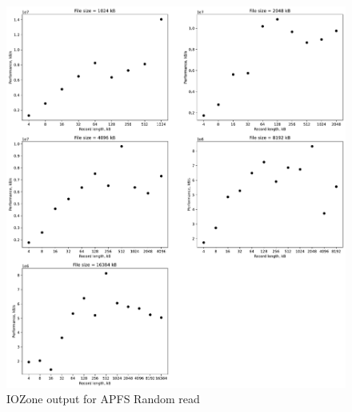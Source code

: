 \begin{figure}[!htb]
	\label{fig:app_bench_apfs_rnd_read}
	\begin{center}
		\includegraphics[width=1.0\textwidth]{figures/benchmarking/local/Random read.pdf}
	\end{center}
	\caption{IOZone output for APFS Random read}
\end{figure}

